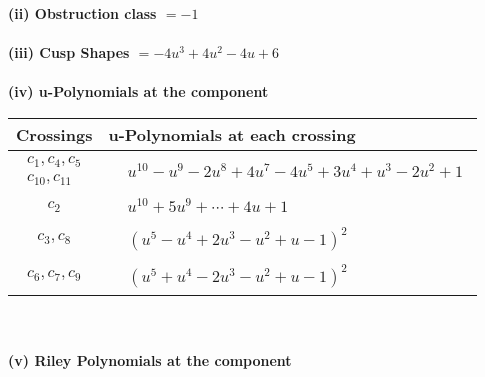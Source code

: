 \documentclass[1p]{elsarticle_modified}
\theoremstyle{definition}
\begin{document}
\flushleft \textbf{(ii) Obstruction class $= -1$}\\~\\
\flushleft \textbf{(iii) Cusp Shapes $= -4 u^3+4 u^2-4 u+6$}\\~\\
\newpage\renewcommand{\arraystretch}{1}
\flushleft \textbf{(iv) u-Polynomials at the component}\newline \\
\begin{tabular}{m{50pt}|m{274pt}}
Crossings & \hspace{64pt}u-Polynomials at each crossing \\
\hline $$\begin{aligned}c_{1},c_{4},c_{5}\\c_{10},c_{11}\end{aligned}$$&$\begin{aligned}
&u^{10}- u^9-2 u^8+4 u^7-4 u^5+3 u^4+u^3-2 u^2+1
\end{aligned}$\\
\hline $$\begin{aligned}c_{2}\end{aligned}$$&$\begin{aligned}
&u^{10}+5 u^9+\cdots+4 u+1
\end{aligned}$\\
\hline $$\begin{aligned}c_{3},c_{8}\end{aligned}$$&$\begin{aligned}
&(u^5- u^4+2 u^3- u^2+u-1)^2
\end{aligned}$\\
\hline $$\begin{aligned}c_{6},c_{7},c_{9}\end{aligned}$$&$\begin{aligned}
&(u^5+u^4-2 u^3- u^2+u-1)^2
\end{aligned}$\\
\hline
\end{tabular}\\~\\
\newpage\renewcommand{\arraystretch}{1}
\flushleft \textbf{(v) Riley Polynomials at the component}\newline \\
\end{document}
